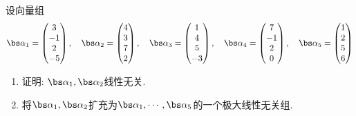 \documentclass{ctexart}
\begin{document}
\begin{problem}
    设向量组
    \[\bs\alpha_1=\begin{pmatrix}
        3\\-1\\2\\-5
    \end{pmatrix},\quad\bs\alpha_2=\begin{pmatrix}
        4\\3\\7\\2
    \end{pmatrix},\quad\bs\alpha_3=\begin{pmatrix}
        1\\4\\5\\-3
    \end{pmatrix},\quad\bs\alpha_4=\begin{pmatrix}
        7\\-1\\2\\0
    \end{pmatrix},\quad\bs\alpha_5=\begin{pmatrix}
        1\\2\\5\\6
    \end{pmatrix}\]
    \begin{enumerate}[label=\tbf{\arabic*}.,topsep=0pt,parsep=0pt,itemsep=0pt,partopsep=0pt]
        \item 证明: $\bs\alpha_1,\bs\alpha_2$线性无关.
        \item 将$\bs\alpha_1,\bs\alpha_2$扩充为$\bs\alpha_1,\cdots,\bs\alpha_5$的一个极大线性无关组.
    \end{enumerate}
\end{problem}
\end{document}
